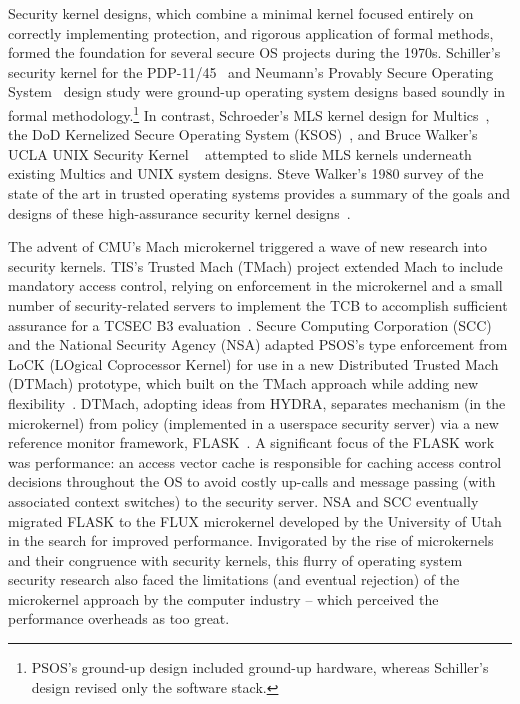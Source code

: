 Security kernel designs, which combine a minimal kernel focused entirely on correctly
implementing protection, and rigorous application of formal methods, formed the foundation
for several secure OS projects during the 1970s.
Schiller's security kernel for the PDP-11/45~\cite{Schiller75} and Neumann's Provably
Secure Operating System~\cite{PSOS} design study were ground-up operating system designs
based soundly in formal methodology.\footnote{PSOS's ground-up design included ground-up hardware,
whereas Schiller's design revised only the software stack.}
In contrast, Schroeder's MLS kernel design for Multics~\cite{schroeder:multicssecuritykernel},
the DoD Kernelized Secure Operating System (KSOS)~\cite{McCauley}, and Bruce Walker's UCLA UNIX
Security Kernel ~\cite{walker:uclasecureunix} attempted to slide MLS kernels underneath existing
Multics and UNIX system designs.
Steve Walker's 1980 survey of the state of the art in trusted operating systems provides a summary
of the goals and designs of these high-assurance security kernel
designs~\cite{walker:adventtrusted}.

The advent of CMU's Mach microkernel triggered a wave of new research into security kernels.
TIS's Trusted Mach (TMach) project extended Mach to include mandatory access
control, relying on enforcement in the microkernel and a small number of
security-related servers to implement the TCB to accomplish sufficient
assurance for a TCSEC B3 evaluation~\cite{BranstadLandauer89}.
Secure Computing Corporation (SCC) and the National Security Agency (NSA) adapted PSOS's
type enforcement from LoCK (LOgical Coprocessor Kernel)
for use in a new Distributed
Trusted Mach (DTMach) prototype, which built on the TMach approach while adding
new flexibility~\cite{sebes:dtmach}.
DTMach, adopting ideas from HYDRA, separates mechanism (in the microkernel) from
policy (implemented in a userspace security server) via a new reference monitor
framework, FLASK~\cite{spencer:flask}.
A significant focus of the FLASK work was performance: an access vector cache is
responsible for caching access control decisions throughout
the OS to avoid costly up-calls and message passing (with associated context switches) to the
security server.
NSA and SCC eventually migrated FLASK to the FLUX microkernel developed by the University of
Utah in the search for improved performance.
Invigorated by the rise of
microkernels and their congruence with security kernels,
this flurry of operating system security research also faced the limitations
(and eventual rejection) of the microkernel approach by the computer industry --
which perceived the performance overheads as too great.

